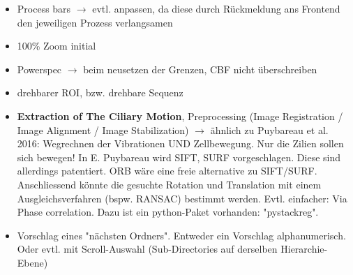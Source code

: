 \documentclass{article}
\begin{document}
\begin{itemize}

\item Process bars $\rightarrow$ evtl. anpassen, da diese durch Rückmeldung ans Frontend 
	den jeweiligen Prozess verlangsamen 
	 
\item 100\% Zoom initial 

\item Powerspec $\rightarrow$ beim neusetzen der Grenzen, CBF nicht überschreiben

\item drehbarer ROI, bzw. drehbare Sequenz 
	 
\item \textbf{Extraction of The Ciliary Motion}, 
Preprocessing (Image Registration / Image Alignment / Image Stabilization) 
$\rightarrow$ ähnlich zu Puybareau et al. 2016: 
Wegrechnen der Vibrationen UND Zellbewegung. Nur die Zilien sollen sich bewegen! 
In E. Puybareau wird SIFT, SURF vorgeschlagen. Diese sind allerdings patentiert. 
ORB wäre eine freie alternative zu SIFT/SURF. Anschliessend könnte die gesuchte 
Rotation und Translation mit einem Ausgleichsverfahren (bspw. RANSAC) bestimmt werden. 
Evtl. einfacher: Via Phase correlation. Dazu ist ein python-Paket vorhanden: "pystackreg". 

\item Vorschlag eines "nächsten Ordners". Entweder ein Vorschlag alphanumerisch. Oder evtl. 
mit Scroll-Auswahl (Sub-Directories auf derselben Hierarchie-Ebene) 




\end{itemize} 
\end{document}
